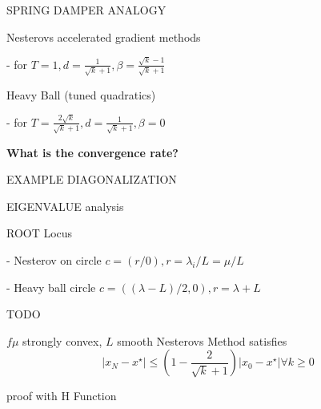 SPRING DAMPER ANALOGY

Nesterovs accelerated gradient methods

- for $T = 1, d=\frac{1}{\sqrt{k}+1}, \beta =\frac{\sqrt{k}-1}{\sqrt{k}+1}$

Heavy Ball (tuned quadratics)

- for $T = \frac{2\sqrt{k}}{\sqrt{k}+1}, d=\frac{1}{\sqrt{k}+1},\beta =0$


\textbf{What is the convergence rate?}

EXAMPLE DIAGONALIZATION

EIGENVALUE analysis

ROOT Locus

- Nesterov on circle $c=(r/0), r=\lambda_i/L = \mu /L$

- Heavy ball circle $c=((\lambda -L)/2 ,0), r= \lambda +L$

TODO
\begin{theorem}
	$f \mu$ strongly convex, $L$ smooth
	Nesterovs Method satisfies
	$$|x_N - x^\star|\le (1-\frac{2}{\sqrt{k}+1})|x_0 - x^\star| \forall k\ge 0$$

\end{theorem}

proof with H Function
